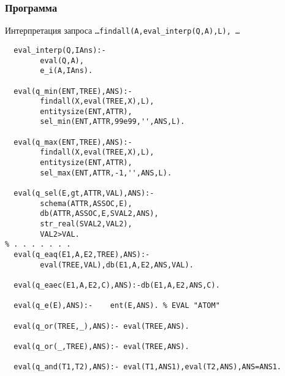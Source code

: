 \documentclass[10pt]{beamer}
\begin{document}
\begin{frame}[fragile]
  \frametitle{Программа}
  Интерпретация запроса \texttt{\ldots findall(A,eval\_interp(Q,A),L), \ldots}
\begin{verbatim}
  eval_interp(Q,IAns):-
		eval(Q,A),
		e_i(A,IAns).

  eval(q_min(ENT,TREE),ANS):-
		findall(X,eval(TREE,X),L),
		entitysize(ENT,ATTR),
		sel_min(ENT,ATTR,99e99,'',ANS,L).

  eval(q_max(ENT,TREE),ANS):-
		findall(X,eval(TREE,X),L),
		entitysize(ENT,ATTR),
		sel_max(ENT,ATTR,-1,'',ANS,L).

  eval(q_sel(E,gt,ATTR,VAL),ANS):-
		schema(ATTR,ASSOC,E),
		db(ATTR,ASSOC,E,SVAL2,ANS),
		str_real(SVAL2,VAL2),
		VAL2>VAL.
% . . . . . . .
  eval(q_eaq(E1,A,E2,TREE),ANS):-
		eval(TREE,VAL),db(E1,A,E2,ANS,VAL).

  eval(q_eaec(E1,A,E2,C),ANS):-db(E1,A,E2,ANS,C).

  eval(q_e(E),ANS):-	ent(E,ANS). % EVAL "ATOM"

  eval(q_or(TREE,_),ANS):- eval(TREE,ANS).

  eval(q_or(_,TREE),ANS):- eval(TREE,ANS).

  eval(q_and(T1,T2),ANS):- eval(T1,ANS1),eval(T2,ANS),ANS=ANS1.
\end{verbatim}
\end{frame}

\end{document}
